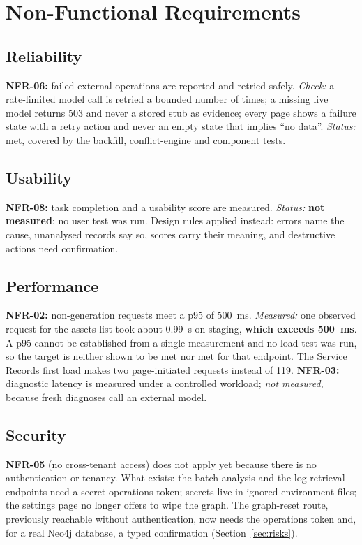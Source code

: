 \section{Non-Functional Requirements}
\subsection{Reliability}
\textbf{NFR-06:} failed external operations are reported and retried safely. \emph{Check:} a rate-limited model call is retried a bounded number of times; a missing live model returns 503 and never a stored stub as evidence; every page shows a failure state with a retry action and never an empty state that implies ``no data''. \emph{Status:} met, covered by the backfill, conflict-engine and component tests.

\subsection{Usability}
\textbf{NFR-08:} task completion and a usability score are measured. \emph{Status:} \textbf{not measured}; no user test was run. Design rules applied instead: errors name the cause, unanalysed records say so, scores carry their meaning, and destructive actions need confirmation.

\subsection{Performance}
\textbf{NFR-02:} non-generation requests meet a p95 of 500~ms. \emph{Measured:} one observed request for the assets list took about 0.99~s on staging, \textbf{which exceeds 500~ms}. A p95 cannot be established from a single measurement and no load test was run, so the target is neither shown to be met nor met for that endpoint. The Service Records first load makes two page-initiated requests instead of 119. \textbf{NFR-03:} diagnostic latency is measured under a controlled workload; \emph{not measured}, because fresh diagnoses call an external model.

\subsection{Security}
\textbf{NFR-05} (no cross-tenant access) does not apply yet because there is no authentication or tenancy. What exists: the batch analysis and the log-retrieval endpoints need a secret operations token; secrets live in ignored environment files; the settings page no longer offers to wipe the graph. The graph-reset route, previously reachable without authentication, now needs the operations token and, for a real Neo4j database, a typed confirmation (Section~\ref{sec:risks}).

